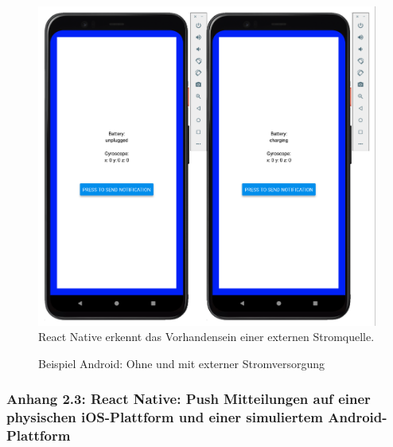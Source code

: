 \documentclass[a4paper]{scrartcl}
\begin{document}
\begin{figure}[H]
	\centering
	\caption{Beispiel Android: Ohne und mit externer Stromversorgung}
	\includegraphics[scale=0.3]{_assets/Android_unplugged_charging.png} \\
	React Native erkennt das Vorhandensein einer externen Stromquelle. 
\end{figure}

\newpage

\subsubsection*{Anhang 2.3: React Native: Push Mitteilungen auf einer physischen iOS-Plattform und einer simuliertem Android-Plattform }
\end{document}
